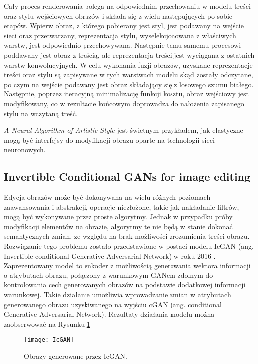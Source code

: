     Cały proces renderowania polega na odpowiednim przechowaniu w modelu treści
    oraz stylu wejściowych obrazów i składa się z wielu następujących po sobie etapów.
    Wpierw obraz, z którego pobierany jest styl, jest podawany na
    wejście sieci oraz przetwarzany, reprezentacja stylu, wyselekcjonowana z
    właściwych warstw, jest odpowiednio przechowywana. Następnie temu samemu
    procesowi poddawany jest obraz z treścią, ale reprezentacja treści jest wyciągana z ostatnich
    warstw konwolucyjnych.
    W celu wykonania fuzji obrazów, uzyskane reprezentacje treści oraz stylu są
    zapisywane w tych warstwach modelu skąd zostały odczytane, po czym na wejście
    podawany jest obraz składający się z losowego szumu białego.
    Następnie, poprzez iteracyjną minimalizację funkcji kosztu, obraz wejściowy jest modyfikowany, co w rezultacie końcowym doprowadza do nałożenia zapisanego
    stylu na wczytaną treść.

    \textit{A Neural Algorithm of Artistic Style} jest świetnym przykładem, jak elastyczne
    mogą być interfejsy do modyfikacji obrazu oparte na technologii sieci neuronowych.

  \subsection{Invertible Conditional GANs for image editing}
    Edycja obrazów może być dokonywana na wielu różnych poziomach zaawansowania
    i abstrakcji, operacje niezłożone, takie jak nakładanie filtrów, mogą być
    wykonywane przez proste algorytmy. Jednak w przypadku próby modyfikacji
    elementów na obrazie, algorytmy te nie będą w stanie dokonać semantycznych
    zmian, ze względu na brak możliwości zrozumienia treści obrazu. Rozwiązanie
    tego problemu zostało przedstawione w postaci modelu IcGAN
    (ang. Invertible conditional Generative Adversarial Network) w roku 2016
    \cite{gan_editing}. Zaprezentowany model to enkoder z możliwością
    generowania wektora informacji o atrybutach obrazu, połączony z warunkowym
    GANem zdolnym do kontrolowania cech generowanych obrazów na podstawie dodatkowej
    informacji warunkowej. Takie działanie umożliwia wprowadzanie zmian w
    atrybutach generowanego obrazu uzyskiwanego na wyjściu cGAN (ang. conditional Generative
    Adversarial Network). Rezultaty działania modelu można zaobserwować na
    Rysunku \ref{fig:IcGAN}

    \begin{figure}[ht]
      \centering
      \texttt{[image: IcGAN]}
      \caption[Obrazy generowane przez IcGAN - źródło: \cite{gan_editing}]{Obrazy generowane przez IcGAN.}
      \label{fig:IcGAN}
    \end{figure}

